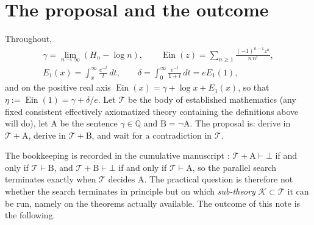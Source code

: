 \documentclass[11pt,a4paper]{article}
\newcommand{\Qbar}{\overline{\mathbb Q}}
\newcommand{\Ein}{\operatorname{Ein}}
\newcommand{\Th}{\mathcal K}
\newcommand{\Tth}{\mathcal T}
\theoremstyle{definition}
\theoremstyle{remark}
\numberwithin{equation}{section}
\begin{document}
\section{The proposal and the outcome}\label{I:sec:scope}

Throughout,
\begin{equation}\label{I:eq:defs}
\begin{gathered}
 \gamma=\lim_{n\to\infty}(H_n-\log n),\qquad
 \Ein(z)=\sum_{n\ge1}\frac{(-1)^{n-1}z^n}{n\,n!},\\
 E_1(x)=\int_x^\infty\frac{e^{-t}}t\,dt,\qquad
 \delta=\int_0^\infty\frac{e^{-t}}{1+t}\,dt=eE_1(1),
\end{gathered}
\end{equation}
and on the positive real axis $\Ein(x)=\gamma+\log x+E_1(x)$, so that
$\eta:=\Ein(1)=\gamma+\delta/e$. Let $\Tth$ be the body of established mathematics
(any fixed consistent effectively axiomatized theory containing the definitions above will
do), let $\mathrm A$ be the sentence $\gamma\in\Qbar$ and $\mathrm B=\neg\mathrm A$.
The proposal is: derive in $\Tth+\mathrm A$, derive in $\Tth+\mathrm B$, and wait for a
contradiction in $\Tth$.

The bookkeeping is recorded in the cumulative manuscript
\cite[Part~VI]{M}: $\Tth+\mathrm A\vdash\bot$ if and only if $\Tth\vdash\mathrm B$, and
$\Tth+\mathrm B\vdash\bot$ if and only if $\Tth\vdash\mathrm A$, so the parallel search
terminates exactly when $\Tth$ decides $\mathrm A$. The practical question is therefore
not whether the search terminates in principle but on which \emph{sub-theory}
$\Th\subset\Tth$ it can be run, namely on the theorems actually available. The outcome
of this note is the following.
\end{document}
